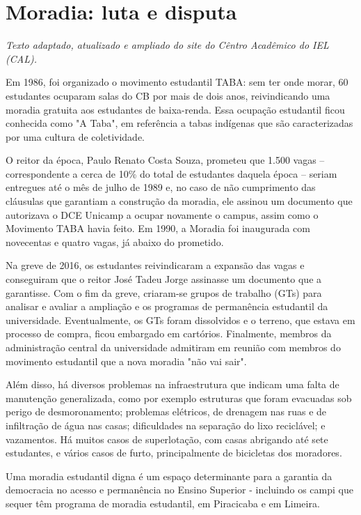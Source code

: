 \section{Moradia: luta e disputa}

\textit{Texto adaptado, atualizado e ampliado do site do Cêntro Acadêmico do IEL (CAL).}

Em 1986, foi organizado o movimento estudantil TABA: sem ter onde morar, 60
estudantes ocuparam salas do CB por mais de dois anos, reivindicando uma moradia
gratuita aos estudantes de baixa-renda. Essa ocupação estudantil ficou conhecida como
"A Taba", em referência a tabas indígenas que são caracterizadas por uma cultura de
coletividade.

O reitor da época, Paulo Renato Costa Souza, prometeu que 1.500 vagas –
correspondente a cerca de 10\% do total de estudantes daquela época – seriam
entregues até o mês de julho de 1989 e, no caso de não cumprimento das cláusulas que
garantiam a construção da moradia, ele assinou um documento que autorizava o DCE
Unicamp a ocupar novamente o campus, assim como o Movimento TABA havia feito. Em
1990, a Moradia foi inaugurada com novecentas e quatro vagas, já abaixo do prometido.

Na greve de 2016, os estudantes reivindicaram a expansão das vagas e conseguiram
que o reitor José Tadeu Jorge assinasse um documento que a garantisse. Com o fim da
greve, criaram-se grupos de trabalho (GTs) para analisar e avaliar a ampliação e os
programas de permanência estudantil da universidade. Eventualmente, os GTs foram
dissolvidos e o terreno, que estava em processo de compra, ficou embargado em
cartórios. Finalmente, membros da administração central da universidade admitiram em
reunião com membros do movimento estudantil que a nova moradia "não vai sair".

Além disso, há diversos problemas na infraestrutura que indicam uma falta de
manutenção generalizada, como por exemplo estruturas que foram evacuadas sob
perigo de desmoronamento; problemas elétricos, de drenagem nas ruas e de infiltração
de água nas casas; dificuldades na separação do lixo reciclável; e vazamentos. Há
muitos casos de superlotação, com casas abrigando até sete estudantes, e vários casos
de furto, principalmente de bicicletas dos moradores.

Uma moradia estudantil digna é um espaço determinante para a garantia da
democracia no acesso e permanência no Ensino Superior - incluindo os campi que
sequer têm programa de moradia estudantil, em Piracicaba e em Limeira.

